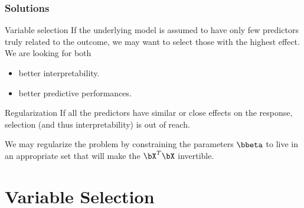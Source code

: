 \documentclass{beamer}\usepackage[]{graphicx}\usepackage[]{color}
\begin{document}
\begin{frame}
  \frametitle{Solutions}

  \begin{block}{Variable selection}
    If the  underlying model  is assumed to  have only  few predictors
    truly related to the outcome,  we may want to \alert{select} those
    with the highest effect. We are looking for both
    \begin{itemize}
    \item better interpretability.
    \item better predictive performances.
    \end{itemize}
  \end{block}

  \vfill

  \begin{block}{Regularization}
    If  all  the predictors  have  similar  or  close effects  on  the
    response, selection (and thus interpretability) is out of reach.

    We may \alert{regularize} the problem by \alert{constraining} the
    parameters $\bbeta$ to  live in an appropriate set  that will make
    the $\bX^T\bX$ invertible.
  \end{block}

\end{frame}
 
\section{Variable Selection}
 
\end{document}
